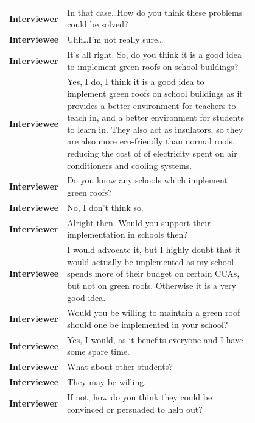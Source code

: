 \documentclass[a4paper]{article}
\begin{document}
\begin{appendices}
\begin{table}[H]
\begin{tabular}{l @{:    } p{0.8\linewidth}}
      \textbf{Interviewer} & In that case\ldots How do you think these
      problems could be solved? \\

      \textbf{Interviewee} & Uhh\ldots I'm not really sure\ldots \\

      \textbf{Interviewer} & It's all right. So, do you think it is a good
      idea to implement green roofs on school buildings? \\

      \textbf{Interviewee} & Yes, I do, I think it is a good idea to
      implement green roofs on school buildings as it provides a better
      environment for teachers to teach in, and a better environment
      for students to learn in. They also act as insulators, so they are
      also more eco-friendly than normal roofs, reducing the cost of of
      electricity spent on air conditioners and cooling systems. \\

      \textbf{Interviewer} & Do you know any schools which implement
      green roofs? \\

      \textbf{Interviewee} & No, I don't think so. \\

      \textbf{Interviewer} & Alright then. Would you support their
      implementation in schools then? \\

      \textbf{Interviewee} & I would advocate it, but I highly doubt
      that it would actually be implemented as my school spends more of
      their budget on certain CCAs, but not on green roofs. Otherwise
      it is a very good idea. \\

      \textbf{Interviewer} & Would you be willing to maintain a green
      roof should one be implemented in your school? \\

      \textbf{Interviewee} & Yes, I would, as it benefits everyone and
      I have some spare time. \\

      \textbf{Interviewer} & What about other students? \\

      \textbf{Interviewee} & They may be willing. \\

      \textbf{Interviewer} & If not, how do you think they could be
      convinced or persuaded to help out? \\


\end{tabular}
\end{table}
\end{appendices}
\end{document}
